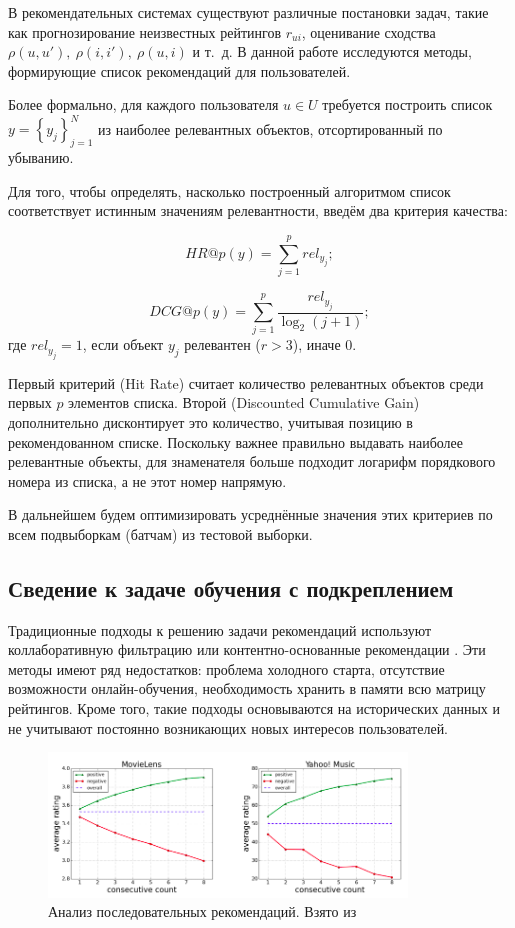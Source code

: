 \documentclass[14pt]{extarticle}
\begin{document}
В рекомендательных системах существуют различные постановки задач, такие как прогнозирование неизвестных рейтингов $r_{ui}$, оценивание сходства $\rho (u, u'),\ \rho (i, i'),\ \rho (u, i)$ и т.~д. В данной работе исследуются методы, формирующие список рекомендаций для пользователей.

Более формально, для каждого пользователя $u\in U$ требуется построить список $y = \left\{y_j\right\}_{j=1}^{N}$ из наиболее релевантных объектов, отсортированный по убыванию.

Для того, чтобы определять, насколько построенный алгоритмом список соответствует истинным значениям релевантности, введём два критерия качества:

$$HR@p(y)=\sum\limits_{j=1}^{p} rel_{y_j};$$

$$DCG@p(y)= \sum\limits _{{j=1}}^{{p}}{\frac  {rel_{y_j}}{\log _{{2}}(j+1)}};$$
где $rel_{y_j}=1$, если объект $y_j$ релевантен ($r>3$), иначе 0.

Первый критерий (Hit Rate) считает количество релевантных объектов среди первых $p$ элементов списка. Второй (Discounted Cumulative Gain) дополнительно дисконтирует это количество, учитывая позицию в рекомендованном списке. Поскольку важнее правильно выдавать наиболее релевантные объекты, для знаменателя больше подходит логарифм порядкового номера из списка, а не этот номер напрямую. 

В дальнейшем будем оптимизировать усреднённые значения этих критериев по всем подвыборкам (батчам) из тестовой выборки.

\subsection{Сведение к задаче обучения с подкреплением} 

Традиционные подходы к решению задачи рекомендаций используют коллаборативную фильтрацию \cite{CF_MF, GoogleNewsCF} или контентно-основанные рекомендации \cite{content-based, content-based_news}. Эти методы имеют ряд недостатков: проблема холодного старта, отсутствие возможности онлайн-обучения, необходимость хранить в памяти всю матрицу рейтингов. Кроме того, такие подходы основываются
на исторических данных и не учитывают постоянно возникающих новых интересов пользователей.

\begin{figure}[h]
	\centering
	\includegraphics[width=0.85\textwidth]{img/consecutive.png}
	\caption{Анализ последовательных рекомендаций. Взято из \cite{Liu2018DeepRL}}
	\label{fig:consequtive}
\end{figure}
\end{document}
